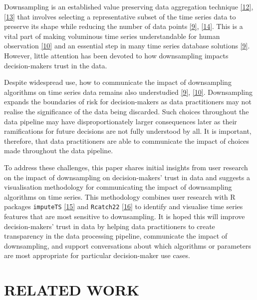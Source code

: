 \documentclass{article}
\begin{document}
Downsampling is an established value preserving data aggregation
technique \protect\hyperlink{ref-downsampling}{{[}12{]}},
\protect\hyperlink{ref-sampling}{{[}13{]}} that involves selecting a
representative subset of the time series data to preserve its shape
while reducing the number of data points
\protect\hyperlink{ref-datapoint}{{[}9{]}},
\protect\hyperlink{ref-MinMaxLTTB}{{[}14{]}}. This is a vital part of
making voluminous time series understandable for human observation
\protect\hyperlink{ref-Sveinn}{{[}10{]}} and an essential step in many
time series database solutions
\protect\hyperlink{ref-datapoint}{{[}9{]}}. However, little attention
has been devoted to how downsampling impacts decision-makers trust in
the data.

Despite widespread use, how to communicate the impact of downsampling
algorithms on time series data remains also understudied
\protect\hyperlink{ref-datapoint}{{[}9{]}},
\protect\hyperlink{ref-Sveinn}{{[}10{]}}. Downsampling expands the
boundaries of risk for decision-makers as data practitioners may not
realise the significance of the data being discarded. Such choices
throughout the data pipeline may have disproportionately larger
consequences later as their ramifications for future decisions are not
fully understood by all. It is important, therefore, that data
practitioners are able to communicate the impact of choices made
throughout the data pipeline.

To address these challenges, this paper shares initial insights from
user research on the impact of downsampling on decision-makers' trust in
data and suggests a visualisation methodology for communicating the
impact of downsampling algorithms on time series. This methodology
combines user research with R packages \texttt{imputeTS}
\protect\hyperlink{ref-imputeTS_R}{{[}15{]}} and \texttt{Rcatch22}
\protect\hyperlink{ref-catch22_R}{{[}16{]}} to identify and visualise
time series features that are most sensitive to downsampling. It is
hoped this will improve decision-makers' trust in data by helping data
practitioners to create transparency in the data processing pipeline,
communicate the impact of downsampling, and support conversations about
which algorithms or parameters are most appropriate for particular
decision-maker use cases.

\hypertarget{related-work}{%
\section{RELATED WORK}\label{related-work}}
\end{document}
